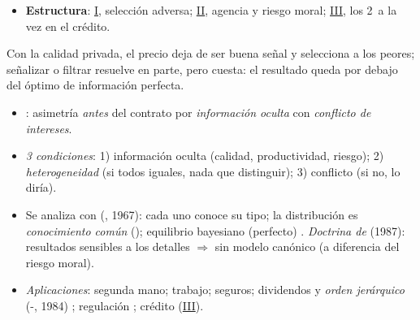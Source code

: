 \documentclass{article}
\begin{document}
\begin{columnas}
\begin{itemize}
\item \textbf{Estructura}: \hyperref[rep:I]{I}, selección adversa; \hyperref[rep:II]{II}, agencia y riesgo moral; \hyperref[rep:III]{III}, los 2~a la vez en el crédito.
\end{itemize}

\begin{ideaclave}
Con la calidad privada, el precio deja de ser buena señal y selecciona a los peores; señalizar o filtrar resuelve en parte, pero cuesta: el resultado queda por debajo del óptimo de información perfecta.
\end{ideaclave}

\begin{itemize}
\item {}: asimetría \emph{antes} del contrato por \emph{información oculta} con \emph{conflicto de intereses}.
\item \emph{3 condiciones}: 1) información oculta (calidad, productividad, riesgo); 2) \emph{heterogeneidad} (si todos iguales, nada que distinguir); 3) conflicto (si no, lo diría).
\item Se analiza con  (, 1967): cada uno conoce su tipo; la distribución es \emph{conocimiento común} (); equilibrio bayesiano (perfecto) . \emph{Doctrina de } (1987): resultados sensibles a los detalles $\Rightarrow$ sin modelo canónico (a diferencia del riesgo moral).
\item \emph{Aplicaciones}: segunda mano; trabajo; seguros; dividendos y \emph{orden jerárquico} (-, 1984) ; regulación ; crédito (\hyperref[rep:III]{III}).
\end{itemize}


\end{columnas}
\end{document}
